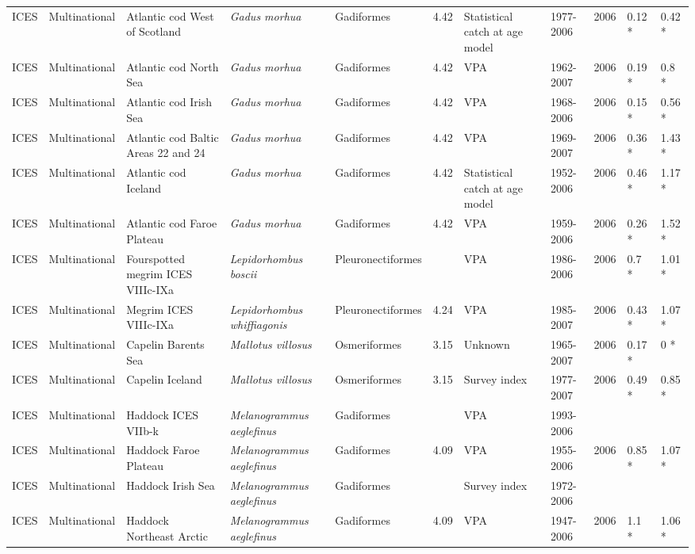 \begin{longtable}{p{1.5cm}p{1.5cm}p{3cm}p{3cm}p{2.5cm}p{0.9cm}p{1.4cm}p{0.9cm}p{0.9cm}p{0.9cm}p{1cm}}
  ICES & Multinational & Atlantic cod West of Scotland & \textit{Gadus morhua} & Gadiformes & 4.42 & Statistical catch at age model & 1977-2006 & 2006 & 0.12 * & 0.42 * \\ 
  ICES & Multinational & Atlantic cod North Sea & \textit{Gadus morhua} & Gadiformes & 4.42 & VPA & 1962-2007 & 2006 & 0.19 * & 0.8 * \\ 
  ICES & Multinational & Atlantic cod Irish Sea & \textit{Gadus morhua} & Gadiformes & 4.42 & VPA & 1968-2006 & 2006 & 0.15 * & 0.56 * \\ 
  ICES & Multinational & Atlantic cod Baltic Areas 22 and 24 & \textit{Gadus morhua} & Gadiformes & 4.42 & VPA & 1969-2007 & 2006 & 0.36 * & 1.43 * \\ 
  ICES & Multinational & Atlantic cod Iceland & \textit{Gadus morhua} & Gadiformes & 4.42 & Statistical catch at age model & 1952-2006 & 2006 & 0.46 * & 1.17 * \\ 
  ICES & Multinational & Atlantic cod Faroe Plateau & \textit{Gadus morhua} & Gadiformes & 4.42 & VPA & 1959-2006 & 2006 & 0.26 * & 1.52 * \\ 
  ICES & Multinational & Fourspotted megrim ICES VIIIc-IXa & \textit{Lepidorhombus boscii} & Pleuronectiformes &  & VPA & 1986-2006 & 2006 & 0.7 * & 1.01 * \\ 
  ICES & Multinational & Megrim ICES VIIIc-IXa & \textit{Lepidorhombus whiffiagonis} & Pleuronectiformes & 4.24 & VPA & 1985-2007 & 2006 & 0.43 * & 1.07 * \\ 
  ICES & Multinational & Capelin Barents Sea & \textit{Mallotus villosus} & Osmeriformes & 3.15 & Unknown & 1965-2007 & 2006 & 0.17 * & 0 * \\ 
  ICES & Multinational & Capelin Iceland & \textit{Mallotus villosus} & Osmeriformes & 3.15 & Survey index & 1977-2007 & 2006 & 0.49 * & 0.85 * \\ 
  ICES & Multinational & Haddock ICES VIIb-k & \textit{Melanogrammus aeglefinus} & Gadiformes &  & VPA & 1993-2006 &  &  &  \\ 
  ICES & Multinational & Haddock Faroe Plateau & \textit{Melanogrammus aeglefinus} & Gadiformes & 4.09 & VPA & 1955-2006 & 2006 & 0.85 * & 1.07 * \\ 
  ICES & Multinational & Haddock Irish Sea & \textit{Melanogrammus aeglefinus} & Gadiformes &  & Survey index & 1972-2006 &  &  &  \\ 
  ICES & Multinational & Haddock Northeast Arctic & \textit{Melanogrammus aeglefinus} & Gadiformes & 4.09 & VPA & 1947-2006 & 2006 & 1.1 * & 1.06 * \\ 

\end{longtable}
